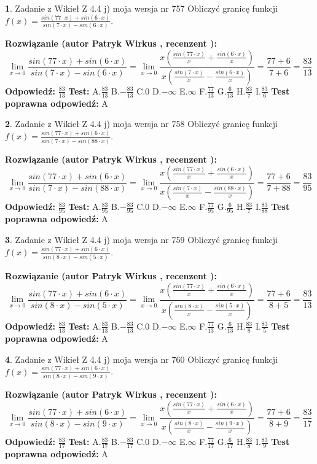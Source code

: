 \documentclass[12pt, a4paper]{article}
\theoremstyle{definition} %
\newtheorem{zad}{}
\newcommand{\zadStart}[1]{\begin{zad}#1\newline}
\newcommand{\zadStop}{\end{zad}}
\newcommand{\rozwStart}[2]{\noindent \textbf{Rozwiązanie (autor #1 , recenzent #2): }\newline}
\newcommand{\rozwStop}{\newline}
\newcommand{\odpStart}{\noindent \textbf{Odpowiedź:}\newline}
\newcommand{\odpStop}{\newline}
\newcommand{\testStart}{\noindent \textbf{Test:}\newline}
\newcommand{\testStop}{\newline}
\newcommand{\kluczStart}{\noindent \textbf{Test poprawna odpowiedź:}\newline}
\newcommand{\kluczStop}{\newline}
\begin{document}
\zadStart{Zadanie z Wikieł Z 4.4 j) moja wersja nr 757}
Obliczyć granicę funkcji $f(x)=\frac{sin(77\cdot x) +sin(6\cdot x)}{sin(7\cdot x) -sin(6\cdot x)}$.
\zadStop
\rozwStart{Patryk Wirkus}{}
$$\lim\limits_{x\to 0}\frac{sin(77\cdot x) +sin(6\cdot x)}{sin(7\cdot x) -sin(6\cdot x)}=\lim\limits_{x\to 0}\frac{x(\frac{sin(77\cdot x)}{x}+\frac{sin(6\cdot x)}{x})}{x(\frac{sin(7\cdot x)}{x}-\frac{sin(6\cdot x)}{x})}=\frac{77+6}{7+6} = \frac{83}{13}$$
\rozwStop
\odpStart
$\frac{83}{13}$
\odpStop
\testStart
A.$\frac{83}{13}$
B.$-\frac{83}{13}$
C.$0$
D.$-\infty$
E.$\infty$
F.$\frac{77}{13}$
G.$\frac{6}{13}$
H.$\frac{83}{7}$
I.$\frac{83}{6}$
\testStop
\kluczStart
A
\kluczStop



\zadStart{Zadanie z Wikieł Z 4.4 j) moja wersja nr 758}
Obliczyć granicę funkcji $f(x)=\frac{sin(77\cdot x) +sin(6\cdot x)}{sin(7\cdot x) -sin(88\cdot x)}$.
\zadStop
\rozwStart{Patryk Wirkus}{}
$$\lim\limits_{x\to 0}\frac{sin(77\cdot x) +sin(6\cdot x)}{sin(7\cdot x) -sin(88\cdot x)}=\lim\limits_{x\to 0}\frac{x(\frac{sin(77\cdot x)}{x}+\frac{sin(6\cdot x)}{x})}{x(\frac{sin(7\cdot x)}{x}-\frac{sin(88\cdot x)}{x})}=\frac{77+6}{7+88} = \frac{83}{95}$$
\rozwStop
\odpStart
$\frac{83}{95}$
\odpStop
\testStart
A.$\frac{83}{95}$
B.$-\frac{83}{95}$
C.$0$
D.$-\infty$
E.$\infty$
F.$\frac{77}{95}$
G.$\frac{6}{95}$
H.$\frac{83}{7}$
I.$\frac{83}{88}$
\testStop
\kluczStart
A
\kluczStop



\zadStart{Zadanie z Wikieł Z 4.4 j) moja wersja nr 759}
Obliczyć granicę funkcji $f(x)=\frac{sin(77\cdot x) +sin(6\cdot x)}{sin(8\cdot x) -sin(5\cdot x)}$.
\zadStop
\rozwStart{Patryk Wirkus}{}
$$\lim\limits_{x\to 0}\frac{sin(77\cdot x) +sin(6\cdot x)}{sin(8\cdot x) -sin(5\cdot x)}=\lim\limits_{x\to 0}\frac{x(\frac{sin(77\cdot x)}{x}+\frac{sin(6\cdot x)}{x})}{x(\frac{sin(8\cdot x)}{x}-\frac{sin(5\cdot x)}{x})}=\frac{77+6}{8+5} = \frac{83}{13}$$
\rozwStop
\odpStart
$\frac{83}{13}$
\odpStop
\testStart
A.$\frac{83}{13}$
B.$-\frac{83}{13}$
C.$0$
D.$-\infty$
E.$\infty$
F.$\frac{77}{13}$
G.$\frac{6}{13}$
H.$\frac{83}{8}$
I.$\frac{83}{5}$
\testStop
\kluczStart
A
\kluczStop



\zadStart{Zadanie z Wikieł Z 4.4 j) moja wersja nr 760}
Obliczyć granicę funkcji $f(x)=\frac{sin(77\cdot x) +sin(6\cdot x)}{sin(8\cdot x) -sin(9\cdot x)}$.
\zadStop
\rozwStart{Patryk Wirkus}{}
$$\lim\limits_{x\to 0}\frac{sin(77\cdot x) +sin(6\cdot x)}{sin(8\cdot x) -sin(9\cdot x)}=\lim\limits_{x\to 0}\frac{x(\frac{sin(77\cdot x)}{x}+\frac{sin(6\cdot x)}{x})}{x(\frac{sin(8\cdot x)}{x}-\frac{sin(9\cdot x)}{x})}=\frac{77+6}{8+9} = \frac{83}{17}$$
\rozwStop
\odpStart
$\frac{83}{17}$
\odpStop
\testStart
A.$\frac{83}{17}$
B.$-\frac{83}{17}$
C.$0$
D.$-\infty$
E.$\infty$
F.$\frac{77}{17}$
G.$\frac{6}{17}$
H.$\frac{83}{8}$
I.$\frac{83}{9}$
\testStop
\kluczStart
A
\kluczStop
\end{document}
